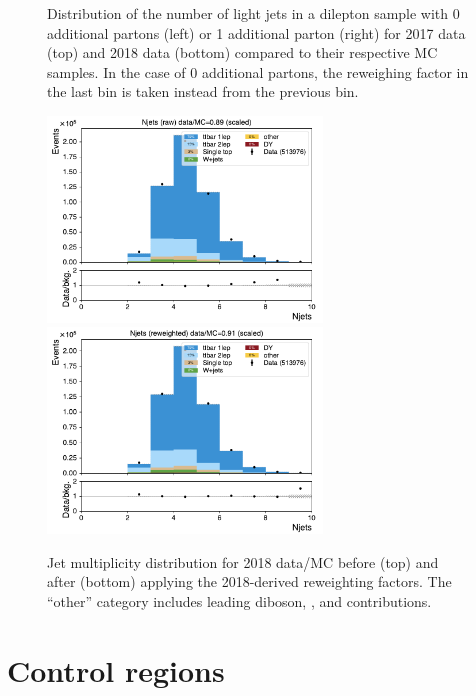 \begin{figure}[h!]
  \caption{
      Distribution of the number of light jets in a dilepton \ttbar sample with 0
      additional partons (left) or 1 additional parton (right) for 2017 data
      (top) and 2018 data (bottom) compared to their respective MC samples.
      In the case of 0 additional partons, the reweighing factor in the last bin
      is taken instead from the previous bin.
  }
  \label{fig:isrweight2}
  \end{figure}

\begin{figure}[h!]
\centering
\includegraphics[width=0.65\textwidth]{figs/ftan/isr/njets_raw.pdf} \\
\includegraphics[width=0.65\textwidth]{figs/ftan/isr/njets_corr.pdf}
\caption{
    Jet multiplicity distribution for 2018 data/MC before (top) and after (bottom)
    applying the 2018-derived reweighting factors. The ``other'' category includes
    leading diboson, \ttW, and \ttZ contributions.
}
\label{fig:isrweightsyst}
\end{figure}


\FloatBarrier

\section{Control regions}

